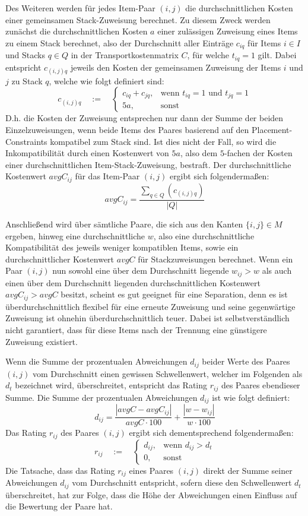Des Weiteren werden für jedes Item-Paar $(i, j)$ die durchschnittlichen Kosten einer gemeinsamen Stack-Zuweisung berechnet.
Zu diesem Zweck werden zunächst die durchschnittlichen Kosten $a$ einer zulässigen Zuweisung eines Items zu einem Stack berechnet,
also der Durchschnitt aller Einträge $c_{iq}$ für Items $i \in I$ und Stacks $q \in Q$ in der Transportkostenmatrix $C$, für
welche $t_{iq} = 1$ gilt. Dabei entspricht $c_{(i, j)q}$ jeweils den Kosten der gemeinsamen Zuweisung der Items $i$ und $j$ zu Stack $q$,
welche wie folgt definiert sind:
\[
    c_{(i, j)q} \quad := \quad
\begin{cases}
    c_{iq} + c_{jq}, & \text{wenn $t_{iq} = 1$ und $t_{jq} = 1$}\\
    5a, & \text{sonst}
\end{cases}
\]
D.h. die Kosten der Zuweisung entsprechen nur dann der Summe der beiden Einzelzuweisungen, wenn beide Items des Paares basierend
auf den Placement-Constraints kompatibel zum Stack sind. Ist dies nicht der Fall, so wird die Inkompatibilität durch
einen Kostenwert von $5a$, also dem $5$-fachen der Kosten einer durchschnittlichen Item-Stack-Zuweisung, bestraft. Der durchschnittliche Kostenwert $avgC_{ij}$ für das Item-Paar $(i, j)$ ergibt sich folgendermaßen:
\[ avgC_{ij} = \frac{\sum_{q \in Q} (c_{(i, j)q})}{|Q|}  \]

Anschließend wird über sämtliche Paare, die sich aus den Kanten $\{i, j\} \in M$ ergeben, hinweg eine durchschnittliche  $w$, also eine durchschnittliche Kompatibilität des jeweils weniger kompatiblen Items, sowie ein durchschnittlicher Kostenwert $avgC$ für Stackzuweisungen berechnet. Wenn ein Paar $(i, j)$ nun sowohl eine über dem Durchschnitt liegende  $w_{ij} > w$ als auch einen über dem Durchschnitt liegenden durchschnittlichen Kostenwert $avgC_{ij} > avgC$ besitzt, scheint es gut geeignet für eine Separation,
denn es ist überdurchschnittlich flexibel für eine erneute Zuweisung und seine gegenwärtige Zuweisung ist ohnehin überdurchschnittlich teuer.
Dabei ist selbstverständlich nicht garantiert, dass für diese Items nach der Trennung eine günstigere Zuweisung existiert.

Wenn die Summe der prozentualen Abweichungen $d_{ij}$ beider Werte des Paares $(i, j)$ vom Durchschnitt einen gewissen Schwellenwert,
welcher im Folgenden als  $d_t$ bezeichnet wird,
überschreitet, entspricht das Rating $r_{ij}$ des Paares ebendieser Summe.
Die Summe der prozentualen Abweichungen $d_{ij}$ ist wie folgt definiert:
\[ d_{ij} = \frac{|avgC - avgC_{ij}|}{avgC \cdot 100} + \frac{|w - w_{ij}|}{w \cdot 100}\]
Das Rating $r_{ij}$ des Paares $(i, j)$ ergibt sich dementsprechend folgendermaßen:
\[
    r_{ij} \quad := \quad
\begin{cases}
    d_{ij}, & \text{wenn $d_{ij} > d_t$}\\
    0, & \text{sonst}
\end{cases}
\]
Die Tatsache, dass das Rating $r_{ij}$ eines Paares $(i, j)$ direkt der Summe seiner Abweichungen $d_{ij}$
vom Durchschnitt entspricht, sofern diese den Schwellenwert $d_t$ überschreitet, hat zur Folge, dass die Höhe der Abweichungen
einen Einfluss auf die Bewertung der Paare hat.

